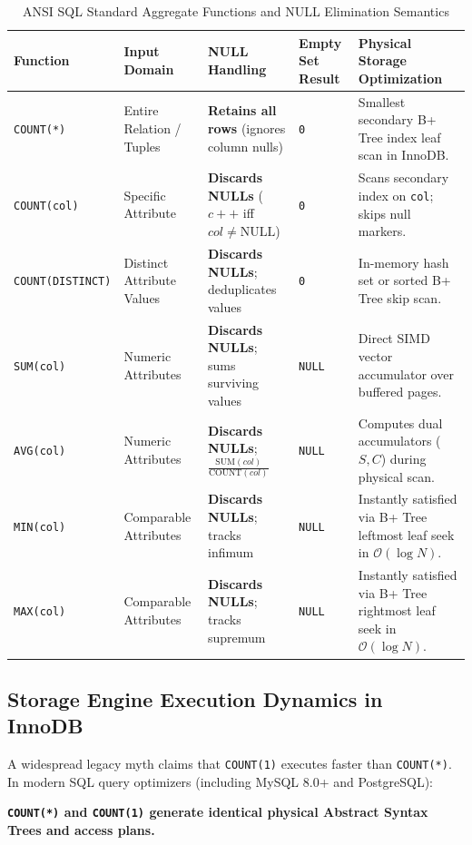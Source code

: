 \documentclass[10pt,twocolumn,letterpaper]{article}
\begin{document}
\begin{table}[htbp]
\caption{ANSI SQL Standard Aggregate Functions and NULL Elimination Semantics}
\label{tab:aggregates}
\centering
\scriptsize
\begin{tabular}{p{2.1cm}p{2.4cm}p{3.0cm}p{2.8cm}p{4.1cm}}
\toprule
\textbf{Function} & \textbf{Input Domain} & \textbf{NULL Handling} & \textbf{Empty Set Result} & \textbf{Physical Storage Optimization} \\
\midrule
\texttt{COUNT(*)} & Entire Relation / Tuples & \textbf{Retains all rows} (ignores column nulls) & \texttt{0} & Smallest secondary B+ Tree index leaf scan in InnoDB. \\
\texttt{COUNT(col)} & Specific Attribute & \textbf{Discards NULLs} ($c++$ iff $col \neq \text{NULL}$) & \texttt{0} & Scans secondary index on \texttt{col}; skips null markers. \\
\texttt{COUNT(DISTINCT)} & Distinct Attribute Values & \textbf{Discards NULLs}; deduplicates values & \texttt{0} & In-memory hash set or sorted B+ Tree skip scan. \\
\texttt{SUM(col)} & Numeric Attributes & \textbf{Discards NULLs}; sums surviving values & \texttt{NULL} & Direct SIMD vector accumulator over buffered pages. \\
\texttt{AVG(col)} & Numeric Attributes & \textbf{Discards NULLs}; $\frac{\text{SUM}(col)}{\text{COUNT}(col)}$ & \texttt{NULL} & Computes dual accumulators ($S, C$) during physical scan. \\
\texttt{MIN(col)} & Comparable Attributes & \textbf{Discards NULLs}; tracks infimum & \texttt{NULL} & Instantly satisfied via B+ Tree leftmost leaf seek in $\mathcal{O}(\log N)$. \\
\texttt{MAX(col)} & Comparable Attributes & \textbf{Discards NULLs}; tracks supremum & \texttt{NULL} & Instantly satisfied via B+ Tree rightmost leaf seek in $\mathcal{O}(\log N)$. \\
\bottomrule
\end{tabular}
\end{table}

\subsection{Storage Engine Execution Dynamics in InnoDB}
A widespread legacy myth claims that \texttt{COUNT(1)} executes faster than \texttt{COUNT(*)}. In modern SQL query optimizers (including MySQL 8.0+ and PostgreSQL):
\begin{center}
\textbf{\texttt{COUNT(*)} and \texttt{COUNT(1)} generate identical physical Abstract Syntax Trees and access plans.}
\end{center}
\end{document}
